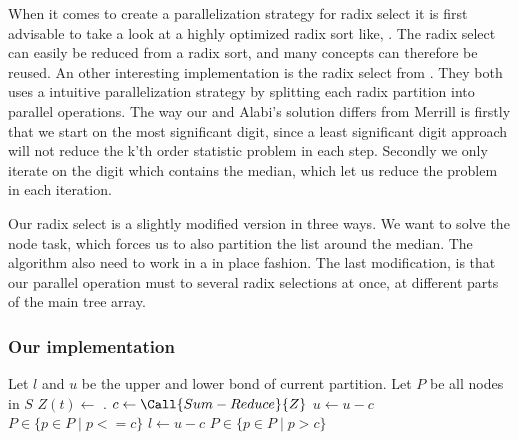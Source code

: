 When it comes to create a parallelization strategy for radix select it is first advisable to take a look at a highly optimized radix sort like, \citep{MerrillG11}. The radix select can easily be reduced from a radix sort, and many concepts can therefore be reused. An other interesting implementation is the radix select from \citep{Alabi:2012}. They both uses a intuitive parallelization strategy by splitting each radix partition into parallel operations. The way our and Alabi's solution differs from Merrill is firstly that we start on the most significant digit, since a least significant digit approach will not reduce the k'th order statistic problem in each step. Secondly we only iterate on the digit which contains the median, which let us reduce the problem in each iteration.

Our radix select is a slightly modified version in three ways. We want to solve the node task, which forces us to also partition the list around the median. The algorithm also need to work in a in place fashion. The last modification, is that our parallel operation must to several radix selections at once, at different parts of the main tree array.


\subsubsection{Our implementation} %
\label{ssub:our_implementation}

\begin{algorithm}
\caption{}
\label{alg:parallel_balance_subtree}
\begin{algorithmic}
        \State Let $l$ and $u$ be the upper and lower bond of current partition.
        \State Let $P$ be all nodes in $S$
        \Repeat
                \State $Z(t) \gets $  .
            \EndFor
            \State $c \gets \Call{Sum-Reduce}{Z}$ 
                \State$ u \gets u-c$
                \State$P \in \{p \in P \mid p <= c\}$
            \Else
                \State$l \gets u-c$
                \State$P \in \{p \in P \mid p > c\}$
            \EndIf
        \State {}
    \EndFunction
\end{algorithmic}
\end{algorithm}



